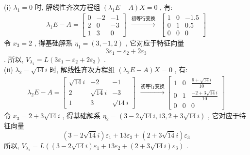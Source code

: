 \documentclass[11pt,a4paper,openany,oneside]{book}
\begin{document}
(i) $ \lambda_1 = 0 $ 时, 解线性齐次方程组 $ (\lambda_1E - A)X=0 $ , 有:
\begin{gather*}
\lambda_1E-A = 
\begin{bmatrix}
0  &  -2  &  -1  \\
2  &  0  &  -3  \\
1  &  3  &  0 
\end{bmatrix} \ \ \xrightarrow{初等行变换} \ \ 
\begin{bmatrix}
1   &  0 &  -1.5  \\
0  &  1 &   0.5   \\
0  &    0   &    0
\end{bmatrix}
\end{gather*}
令 $ x_3 = 2 $ , 得基础解系 $ \eta_1 = (3, -1, 2) $ , 它对应于特征向量
 $$ 3\varepsilon_1-\varepsilon_2+2\varepsilon_3 $$ . 
所以,  $ V_{\lambda_1} = L(3\varepsilon_1-\varepsilon_2+2\varepsilon_3) $ .  \\

(ii) $ \lambda_2=\sqrt{14}i $ 时, 解线性齐次方程组 $ (\lambda_2E - A)X = 0 $ , 有:
\begin{gather*}
\lambda_2E - A=
\begin{bmatrix}
\sqrt{14}i  &  -2  &  -1  \\
2  &  \sqrt{14}i  &  -3  \\
1  &  3  &  \sqrt{14}i
\end{bmatrix} \ \ \xrightarrow{初等行变换}
\begin{bmatrix}
1  &  0  &   \frac{6+\sqrt{14}i}{10} \\
0  &  1  &   \frac{-2+3\sqrt{14}i}{10} \\
0  &  0  &  0  
\end{bmatrix}
\end{gather*}
令 $ x_3 =2+3\sqrt{14}i $ , 得基础解系 $ \eta_2 = (3-2\sqrt{14}i,13, 2 +3\sqrt{14}i) $ , 它对应于特征向量
 $$ (3-2\sqrt{14}i)\varepsilon_1 + 13\varepsilon_2 +( 2 +3\sqrt{14}i)\varepsilon_3 $$ 
所以,  $ V_{\lambda_2} = L((3-2\sqrt{14}i)\varepsilon_1 + 13\varepsilon_2 +( 2 +3\sqrt{14}i)\varepsilon_3) $ . \\
\end{document}
